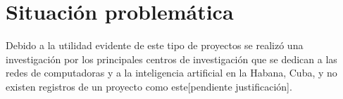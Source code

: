 
\section*{Situación problemática}
Debido a la utilidad evidente de este tipo de proyectos se realizó una investigación por los principales centros de investigación que se dedican a las redes de computadoras y a la inteligencia artificial en la Habana, Cuba, y no existen registros de un proyecto como este[pendiente justificación]. 





